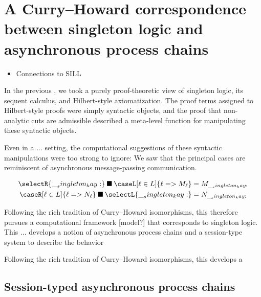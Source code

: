 \chapter{A Curry--Howard correspondence between singleton logic and asynchronous process chains}\label{ch:singleton-processes}

\begin{itemize}
\item Connections to SILL
\end{itemize}

In the previous , we took a purely proof-theoretic view of singleton logic, its sequent calculus, and Hilbert-style axiomatization.
The proof terms assigned to Hilbert-style proofs were simply syntactic objects, and the proof that non-analytic cuts are admissible described a meta-level function for manipulating these syntactic objects.

Even in a ... setting, the computational suggestions of these syntactic manipulations were too strong to ignore:
We saw that the principal cases are reminiscent of asynchronous message-passing communication.
\begin{marginfigure}
  \begin{align*}
    \nspawn{\selectR{\kay}}{\caseL[\ell \in L]{\ell => M_{\ell}}}
      &= M_{\kay}
    \\
    \nspawn{\caseR[\ell \in L]{\ell => N_{\ell}}}{\selectL{\kay}}
      &= N_{\kay}
  \end{align*}
\end{marginfigure}

Following the rich tradition of Curry--Howard isomorphisms, this  therefore pursues a computational framework [model?] that corresponds to singleton logic.
This ... develops a notion of asynchronous process chains and a session-type system to describe the behavior

Following the rich tradition of Curry--Howard isomorphisms, this  develops a 


\section{Session-typed asynchronous process chains}

